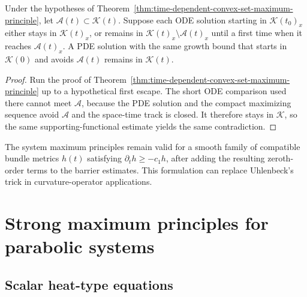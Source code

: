 \begin{theorem}
\label{thm:noncompact-system-avoidance-set-maximum-principle}
Under the hypotheses of
Theorem~\ref{thm:time-dependent-convex-set-maximum-principle}, let
$\mathcal A(t)\subset\mathcal K(t)$.  Suppose each ODE solution starting in
$\mathcal K(t_0)_x$ either stays in $\mathcal K(t)_x$, or remains in
$\mathcal K(t)_x\setminus\mathcal A(t)_x$ until a first time when it reaches
$\mathcal A(t)_x$.  A PDE solution with the same growth bound that starts in
$\mathcal K(0)$ and avoids $\mathcal A(t)$ remains in $\mathcal K(t)$.
\end{theorem}

\begin{proof}
\sketch
{}
Run the proof of
Theorem~\ref{thm:time-dependent-convex-set-maximum-principle} up to a
hypothetical first escape.  The short ODE comparison used there cannot meet
$\mathcal A$, because the PDE solution and the compact maximizing sequence
avoid $\mathcal A$ and the space-time track is closed.  It therefore stays in
$\mathcal K$, so the same supporting-functional estimate yields the same
contradiction.
\end{proof}

\begin{remark}
\label{rem:maximum-principles-time-dependent-bundle-metric}
The system maximum principles remain valid for a smooth family of compatible
bundle metrics $h(t)$ satisfying $\partial_th\geq-c_1h$, after adding the
resulting zeroth-order terms to the barrier estimates.  This formulation can
replace Uhlenbeck's trick in curvature-operator applications.
\end{remark}

\section{Strong maximum principles for parabolic systems}

\subsection{Scalar heat-type equations}

